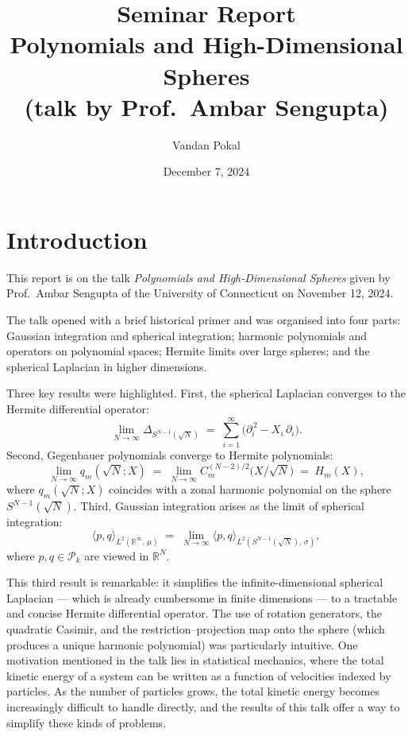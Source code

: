 \documentclass[11pt]{article}
\title{Seminar Report \\[2pt]
       \large Polynomials and High-Dimensional Spheres \\
       (talk by Prof.\ Ambar Sengupta)}
\author{Vandan Pokal}
\date{December 7, 2024}
\begin{document}
\maketitle

\section*{Introduction}

This report is on the talk \emph{Polynomials and High-Dimensional Spheres} given
by Prof.\ Ambar Sengupta of the University of Connecticut on November 12, 2024.

The talk opened with a brief historical primer and was organised into four
parts: Gaussian integration and spherical integration; harmonic polynomials
and operators on polynomial spaces; Hermite limits over large spheres; and the
spherical Laplacian in higher dimensions.

Three key results were highlighted. First, the spherical Laplacian converges to
the Hermite differential operator:
\[
  \lim_{N\to\infty} \Delta_{S^{N-1}(\sqrt{N})}
  \;=\; \sum_{i=1}^{\infty}\bigl(\partial_i^{\,2} - X_i\,\partial_i\bigr).
\]
Second, Gegenbauer polynomials converge to Hermite polynomials:
\[
  \lim_{N\to\infty} q_m(\sqrt{N};X)
  \;=\; \lim_{N\to\infty} C_m^{(N-2)/2}\!\bigl(X/\sqrt{N}\bigr)
  \;=\; H_m(X),
\]
where $q_m(\sqrt{N}; X)$ coincides with a zonal harmonic polynomial on the
sphere $S^{N-1}(\sqrt{N})$. Third, Gaussian integration arises as the limit of
spherical integration:
\[
  \langle p, q\rangle_{L^2(\mathbb{R}^\infty,\,\mu)}
  \;=\; \lim_{N\to\infty}
  \langle p, q\rangle_{L^2(S^{N-1}(\sqrt{N}),\,\bar{\sigma})},
\]
where $p, q \in \mathcal{P}_k$ are viewed in $\mathbb{R}^N$.

This third result is remarkable: it simplifies the infinite-dimensional
spherical Laplacian --- which is already cumbersome in finite dimensions --- to
a tractable and concise Hermite differential operator. The use of rotation
generators, the quadratic Casimir, and the restriction--projection map onto the
sphere (which produces a unique harmonic polynomial) was particularly
intuitive. One motivation mentioned in the talk lies in statistical mechanics,
where the total kinetic energy of a system can be written as a function of
velocities indexed by particles. As the number of particles grows, the total
kinetic energy becomes increasingly difficult to handle directly, and the
results of this talk offer a way to simplify these kinds of problems.
\end{document}
